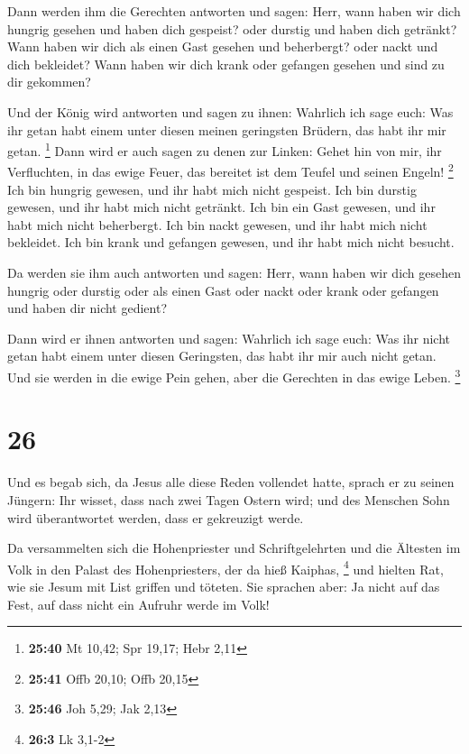  Dann werden ihm die Gerechten antworten und sagen: Herr,
wann haben wir dich hungrig gesehen und haben dich gespeist? oder
durstig und haben dich getränkt?  Wann haben wir dich als
einen Gast gesehen und beherbergt? oder nackt und dich bekleidet?
 Wann haben wir dich krank oder gefangen gesehen und sind
zu dir gekommen?

 Und der König wird antworten und sagen zu ihnen:
Wahrlich ich sage euch: Was ihr getan habt einem unter diesen meinen
geringsten Brüdern, das habt ihr mir getan. \footnote{\textbf{25:40} Mt
  10,42; Spr 19,17; Hebr 2,11}  Dann wird er auch sagen
zu denen zur Linken: Gehet hin von mir, ihr Verfluchten, in das ewige
Feuer, das bereitet ist dem Teufel und seinen Engeln! \footnote{\textbf{25:41}
  Offb 20,10; Offb 20,15}  Ich bin hungrig gewesen, und
ihr habt mich nicht gespeist. Ich bin durstig gewesen, und ihr habt mich
nicht getränkt.  Ich bin ein Gast gewesen, und ihr habt
mich nicht beherbergt. Ich bin nackt gewesen, und ihr habt mich nicht
bekleidet. Ich bin krank und gefangen gewesen, und ihr habt mich nicht
besucht.

 Da werden sie ihm auch antworten und sagen: Herr, wann
haben wir dich gesehen hungrig oder durstig oder als einen Gast oder
nackt oder krank oder gefangen und haben dir nicht gedient?

 Dann wird er ihnen antworten und sagen: Wahrlich ich
sage euch: Was ihr nicht getan habt einem unter diesen Geringsten, das
habt ihr mir auch nicht getan.  Und sie werden in die
ewige Pein gehen, aber die Gerechten in das ewige Leben. \footnote{\textbf{25:46}
  Joh 5,29; Jak 2,13}

\hypertarget{section-13}{%
\section{26}\label{section-13}}

 Und es begab sich, da Jesus alle diese Reden vollendet
hatte, sprach er zu seinen Jüngern:  Ihr wisset, dass nach
zwei Tagen Ostern wird; und des Menschen Sohn wird überantwortet werden,
dass er gekreuzigt werde.

 Da versammelten sich die Hohenpriester und
Schriftgelehrten und die Ältesten im Volk in den Palast des
Hohenpriesters, der da hieß Kaiphas, \footnote{\textbf{26:3} Lk 3,1-2}
 und hielten Rat, wie sie Jesum mit List griffen und
töteten.  Sie sprachen aber: Ja nicht auf das Fest, auf
dass nicht ein Aufruhr werde im Volk!

